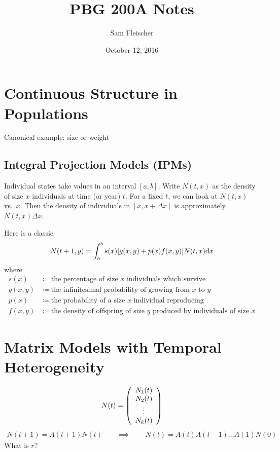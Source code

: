 \documentclass{article}
\title{PBG 200A Notes}
\author{Sam Fleischer}
\date{October 12, 2016}
\begin{document}
    \maketitle

    \section{Continuous Structure in Populations}
        Canonical example: size or weight

        \subsection{Integral Projection Models (IPMs)}
            Individual states take values in an interval $[a,b]$.  Write $N(t,x)$ as the density of size $x$ individuals at time (or year) $t$.  For a fixed $t$, we can look at $N(t,x)$ vs.~$x$.  Then the density of individuals in $[x, x+\Delta x]$ is approximately $N(t,x)\Delta x$.

            Here is a classic
            \begin{align}
                N(t+1,y) = \int_a^b s(x)\qty[g(x,y) + p(x)f(x,y)]N(t,x)\dd x
            \end{align}
            where
            \begin{align}
                s(x) & \coloneqq \text{the percentage of size $x$ individuals which survive} \\
                g(x,y) &\coloneqq \text{the infinitesimal probability of growing from $x$ to $y$} \\
                p(x) &\coloneqq \text{the probability of a size $x$ individual reproducing} \\
                f(x,y) &\coloneqq \text{the density of offspring of size $y$ produced by individuals of size $x$}
            \end{align}

    \section{Matrix Models with Temporal Heterogeneity}
        \begin{align}
            N(t) = \qty(\begin{array}{c}
                N_1(t) \\ N_2(t) \\ \vdots \\ N_k(t)
            \end{array})
        \end{align}
        \begin{align}
            N(t+1) = A(t+1)N(t) \qquad \implies \qquad N(t) = A(t)A(t-1)\dots A(1)N(0)
        \end{align}
        What is $r$?
\end{document}
